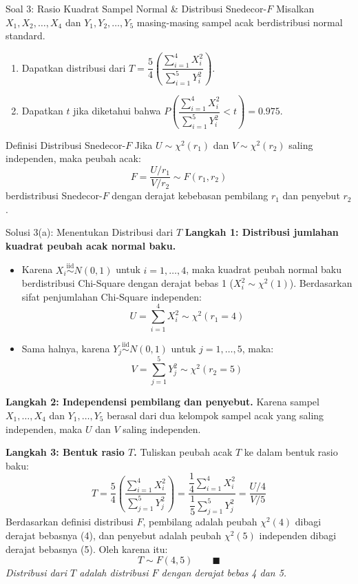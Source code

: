 \documentclass[10pt,twoside]{article}
\begin{document}
\begin{soalbox}{Soal 3: Rasio Kuadrat Sampel Normal \& Distribusi Snedecor-$F$}
Misalkan $X_1, X_2, \dots, X_4$ dan $Y_1, Y_2, \dots, Y_5$ masing-masing sampel acak berdistribusi normal standard.
\begin{enumerate}[label=(\alph*)]
  \item Dapatkan distribusi dari $T = \dfrac{5}{4} \left( \dfrac{\sum_{i=1}^{4} X_i^2}{\sum_{i=1}^{5} Y_i^2} \right)$.
  \item Dapatkan $t$ jika diketahui bahwa $P\left( \dfrac{\sum_{i=1}^{4} X_i^2}{\sum_{i=1}^{5} Y_i^2} < t \right) = 0.975$.
\end{enumerate}
\end{soalbox}

\begin{tipbox}{Definisi Distribusi Snedecor-$F$}
Jika $U \sim \chi^2(r_1)$ dan $V \sim \chi^2(r_2)$ saling independen, maka peubah acak:
\[
F = \frac{U / r_1}{V / r_2} \sim F(r_1, r_2)
\]
berdistribusi Snedecor-$F$ dengan derajat kebebasan pembilang $r_1$ dan penyebut $r_2$.
\end{tipbox}

\begin{solbox}{Solusi 3(a): Menentukan Distribusi dari $T$}
\textbf{Langkah 1: Distribusi jumlahan kuadrat peubah acak normal baku.}
\begin{itemize}
  \item Karena $X_i \overset{\mathrm{iid}}{\sim} N(0, 1)$ untuk $i = 1, \dots, 4$, maka kuadrat peubah normal baku berdistribusi Chi-Square dengan derajat bebas 1 ($X_i^2 \sim \chi^2(1)$).
  Berdasarkan sifat penjumlahan Chi-Square independen:
  \[
  U = \sum_{i=1}^4 X_i^2 \sim \chi^2(r_1 = 4)
  \]
  \item Sama halnya, karena $Y_j \overset{\mathrm{iid}}{\sim} N(0, 1)$ untuk $j = 1, \dots, 5$, maka:
  \[
  V = \sum_{j=1}^5 Y_j^2 \sim \chi^2(r_2 = 5)
  \]
\end{itemize}

\textbf{Langkah 2: Independensi pembilang dan penyebut.}
Karena sampel $X_1, \dots, X_4$ dan $Y_1, \dots, Y_5$ berasal dari dua kelompok sampel acak yang saling independen, maka $U$ dan $V$ saling independen.

\textbf{Langkah 3: Bentuk rasio $T$.}
Tuliskan peubah acak $T$ ke dalam bentuk rasio baku:
\[
T = \frac{5}{4} \left( \frac{\sum_{i=1}^{4} X_i^2}{\sum_{j=1}^{5} Y_j^2} \right) = \frac{\dfrac{1}{4} \sum_{i=1}^4 X_i^2}{\dfrac{1}{5} \sum_{j=1}^5 Y_j^2} = \frac{U / 4}{V / 5}
\]
Berdasarkan definisi distribusi $F$, pembilang adalah peubah $\chi^2(4)$ dibagi derajat bebasnya (4), dan penyebut adalah peubah $\chi^2(5)$ independen dibagi derajat bebasnya (5).
Oleh karena itu:
\[
\boxed{T \sim F(4, 5)} \qquad \blacksquare
\]
\textit{Distribusi dari $T$ adalah distribusi $F$ dengan derajat bebas 4 dan 5.}
\end{solbox}
\end{document}
